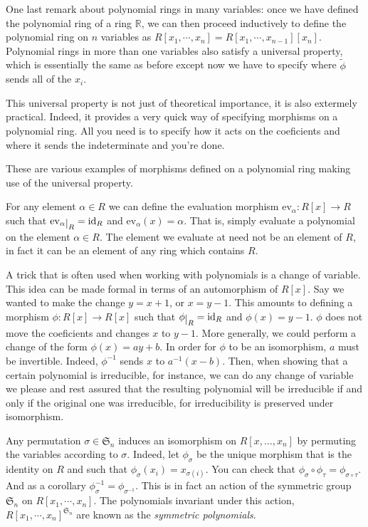 \documentclass[12pt,oneside]{book}
\numberwithin{table}{section}
\numberwithin{equation}{section}
\numberwithin{figure}{section}
\newcommand{\rest}[1]{\raisebox{-.5ex}{$|$}_{#1}}
\newcommand{\R}{\mathbb{R}}
\renewcommand{\S}{\mathfrak{S}}
\newcommand{\id}{\mathrm{id}}
\newcommand{\ev}[1]{\mathrm{ev}_{#1}}
\begin{document}
One last remark about polynomial rings in many variables: once we have defined the polynomial ring of a ring \( \R \), we can then proceed inductively to define the polynomial ring on \( n \) variables as \( R[x_1, \cdots, x_n] = R[x_1, \cdots, x_{n-1}][x_n] \). Polynomial rings in more than one variables also satisfy a universal property, which is essentially the same as before except now we have to specify where \( \tilde{\phi} \) sends all of the \( x_i \).

This universal property is not just of theoretical importance, it is also extermely practical. Indeed, it provides a very quick way of specifying morphisms on a polynomial ring. All you need is to specify how it acts on the coeficients and where it sends the indeterminate and you're done.

\begin{example}
	These are various examples of morphisms defined on a polynomial ring making use of the universal property.
	\begin{points}
	\item For any element \( \alpha \in R \) we can define the evaluation morphism \( \ev{\alpha} \colon R[x] \to R \) such that \( \ev{\alpha}\rest{R} = \id_R \) and \( \ev{\alpha}(x) = \alpha \). That is, simply evaluate a polynomial on the element \( \alpha \in R \). The element we evaluate at need not be an element of \( R \), in fact it can be an element of any ring which contains \( R \). 

	\item A trick that is often used when working with polynomials is a change of variable. This idea can be made formal in terms of an automorphism of \( R[x] \). Say we wanted to make the change \( y = x+1 \), or \( x = y-1 \). This amounts to defining a morphism \( \phi \colon R[x] \to R[x] \) such that \( \phi \rest{R} = \id_R \) and \( \phi(x) = y-1 \). \( \phi \) does not move the coeficients and changes \( x \) to \( y-1 \). More generally, we could perform a change of the form \( \phi(x) = ay + b \). In order for \( \phi \) to be an isomorphism, \( a \) must be invertible. Indeed, \( \phi^{-1} \) sends \( x \) to \( a^{-1}(x - b) \). Then, when showing that a certain polynomial is irreducible, for instance, we can do any change of variable we please and rest assured that the resulting polynomial will be irreducible if and only if the original one was irreducible, for irreducibility is preserved under isomorphism.	

	\item Any permutation \( \sigma \in \S_n \) induces an isomorphism on \( R[x, \dots, x_n] \) by permuting the variables according to \( \sigma \). Indeed, let \( \phi_{\sigma} \) be the unique morphism that is the identity on \( R \) and such that \( \phi_{\sigma}(x_i) = x_{\sigma(i)} \). You can check that \( \phi_{\sigma} \circ \phi_{\tau} = \phi_{\sigma \circ \tau} \). And as a corollary \( \phi_{\sigma}^{-1} = \phi_{\sigma^{-1}} \). This is in fact an action of the symmetric group \( \S_n \) on \( R[x_1, \cdots, x_n] \). The polynomials invariant under this action, \( R[x_1, \cdots, x_n]^{\S_n} \) are known as the \emph{symmetric polynomials}.

	\end{points}
\end{example}
\end{document}
